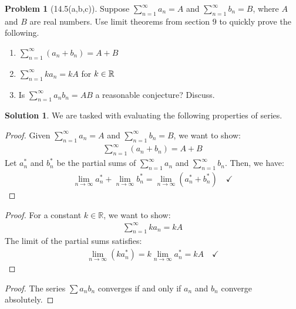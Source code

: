 \documentclass[12pt]{article}
\theoremstyle{definition} %
\newtheorem{solution}{Solution}
\newtheorem{problem}{Problem}
\theoremstyle{plain} %
\begin{document}
\begin{problem}[14.5(a,b,c)]
   Suppose $\sum_{n=1}^{\infty} a_{n} =A$ and $\sum_{n=1}^{\infty} b_{n} =B$, where $A$ and $B$ are real numbers. Use limit theorems from section $9$ to quickly prove the following.
   \begin{enumerate}
    \item $\sum_{n=1}^{\infty} (a_{n} +b_{n}  )=A+B$
    \item $\sum_{n=1}^{\infty} ka_{n} =kA$ for $k\in \mathbb{\MakeUppercase{r}} $   
    \item Is $\sum_{n=1}^{\infty} a_{n}b_{n} =AB$ a reasonable conjecture? Discuss.  
   \end{enumerate}  
\end{problem}
   \begin{solution}
      We are tasked with evaluating the following properties of series.
      
      \begin{enumerate}
          \item \begin{proof}
            Given $ \sum_{n=1}^{\infty} a_n = A $ and $ \sum_{n=1}^{\infty} b_n = B $, we want to show:
            \begin{align}
            \sum_{n=1}^{\infty} (a_n + b_n) = A + B
            \end{align}
            Let $ a_n^* $ and $ b_n^* $ be the partial sums of $ \sum_{n=1}^{\infty} a_n $ and $ \sum_{n=1}^{\infty} b_n $. Then, we have:
            \begin{align}
            \lim_{n \to \infty} a_n^* + \lim_{n \to \infty} b_n^* = \lim_{n \to \infty} (a_n^* + b_n^*) \quad \checkmark
            \end{align}
            
            
          \end{proof}
          \item \begin{proof}
            \item For a constant $ k \in \mathbb{R} $, we want to show:
            \begin{align}
            \sum_{n=1}^{\infty} k a_n = kA
            \end{align}
            The limit of the partial sums satisfies:
            \begin{align}
            \lim_{n \to \infty} (k a_n^*) = k \lim_{n \to \infty} a_n^* = kA \quad \checkmark
            \end{align}  
          \end{proof}
          \item \begin{proof}
            The series $ \sum a_nb_n $ converges if and only if $a_{n}$ and $b_{n}$ converge absolutely. 
          \end{proof}
      \end{enumerate}
      
      \end{solution}
\end{document}
